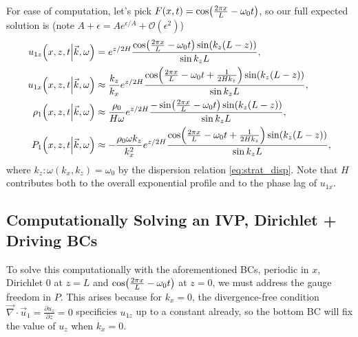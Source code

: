 \documentclass[11pt,
        usenames, %
        dvipsnames %
    ]{report}
\newcommand*{\pd}[2]{\frac{\partial#1}{\partial#2}}
\DeclarePairedDelimiter\p{\lparen}{\rparen}
\begin{document}
For ease of computation, let's pick $F(x, t) = \cos \p*{\frac{2 \pi x}{L} -
\omega_0 t}$, so our full expected solution is (note $A + \epsilon =
Ae^{\epsilon/A} + \mathcal{O}(\epsilon^2)$)
\begin{equation}
    \begin{split}
        u_{1z}\p*{x, z, t \middle | \vec{k}, \omega}
            &= e^{z/2H}\frac{\cos\p*{\frac{2\pi x}{L} - \omega_0 t}
                \sin \p*{k_z(L - z)}}{\sin k_zL},\\
        u_{1x}\p*{x, z, t \middle | \vec{k}, \omega}
            &\approx \frac{k_z}{k_x} e^{z/2H}\frac{
                \cos\p*{\frac{2\pi x}{L} - \omega_0 t + \frac{1}{2Hk_z}}
                \sin \p*{k_z(L - z)}
            }{\sin k_zL},\\
        \rho_1\p*{x, z, t \middle | \vec{k}, \omega}
            &\approx \frac{\rho_0}{H\omega} e^{z/2H}\frac{
                -\sin\p*{\frac{2\pi x}{L} - \omega_0 t}
                \sin \p*{k_z(L - z)}
            }{\sin k_zL},\\
        P_1\p*{x, z, t \middle | \vec{k}, \omega}
            &\approx -\frac{\rho_0 \omega k_z}{k_x^2} e^{z/2H}\frac{
                \cos\p*{\frac{2\pi x}{L} - \omega_0 t + \frac{1}{2Hk_z}}
                \sin \p*{k_z(L - z)}
            }{\sin k_zL},\\
    \end{split}\label{eq:strat.part_sol}
\end{equation}
where $k_z: \omega(k_x, k_z) = \omega_0$ by the dispersion relation
\autoref{eq:strat_disp}. Note that $H$ contributes both to the overall
exponential profile and to the phase lag of $u_{1x}$.

\subsection{Computationally Solving an IVP, Dirichlet + Driving BCs}

To solve this computationally with the aforementioned BCs, periodic in $x$,
Dirichlet $0$ at $z = L$ and $\cos \p*{\frac{2\pi x}{L} - \omega_0 t}$ at $z =
0$, we must address the gauge freedom in $P$. This arises because for $k_x = 0$,
the divergence-free condition $\vec{\nabla} \cdot \vec{u}_1 = \pd{u_z}{z} = 0$
specificies $u_{1z}$ up to a constant already, so the bottom BC will fix the
value of $u_z$ when $k_x = 0$.
\end{document}
